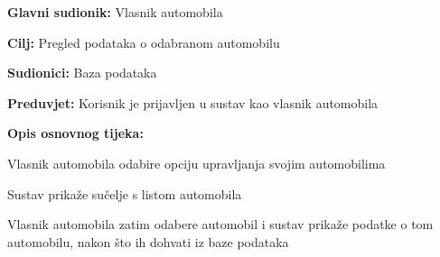 \noindent {}
\begin{packed_item}

	\item \textbf{Glavni sudionik: } Vlasnik automobila
	\item  \textbf{Cilj:} Pregled podataka o odabranom automobilu
	\item  \textbf{Sudionici:} Baza podataka
	\item  \textbf{Preduvjet:} Korisnik je prijavljen u sustav kao vlasnik automobila
	\item  \textbf{Opis osnovnog tijeka:}

	\item[] \begin{packed_enum}

		\item Vlasnik automobila odabire opciju upravljanja svojim automobilima
		\item Sustav prikaže sučelje s listom automobila
		\item Vlasnik automobila zatim odabere automobil i sustav prikaže podatke o tom
		automobilu, nakon što ih dohvati iz baze podataka

	\end{packed_enum}
\end{packed_item}

